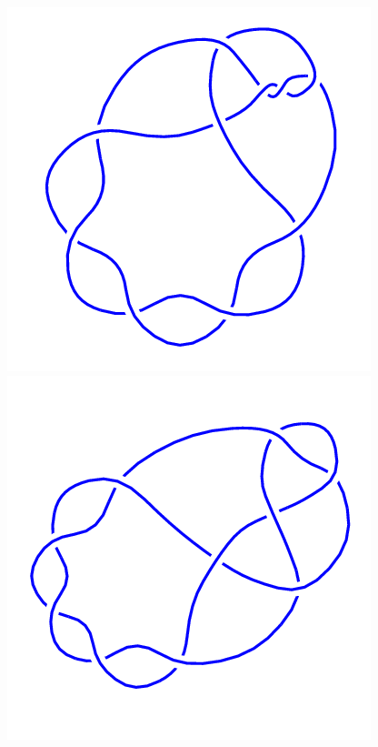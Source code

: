 \begin{figure}[H]
\begin{minipage}[b]{.18\linewidth}
	\end{minipage}
	\begin{minipage}[b]{.18\linewidth}
		\centering
		\includegraphics[width=\linewidth]{../data/10_9.png}
	\end{minipage}
	\begin{minipage}[b]{.18\linewidth}
		\centering
		\includegraphics[width=\linewidth]{../data/10_10.png}

\end{minipage}
\end{figure}
